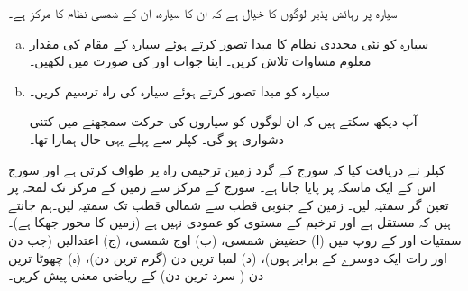 سیارہ  پر رہائش پذیر  لوگوں کا خیال ہے کہ ان کا سیارہ، ان کے شمسی نظام کا مرکز ہے۔
\begin{enumerate}[a.]
\item
سیارہ  کو نئی محددی نظام کا  مبدا  تصور کرتے ہوئے سیارہ  کے مقام کی مقدار معلوم مساوات تلاش کریں۔ اپنا جواب  اور کی صورت میں لکھیں۔
\item
سیارہ  کو مبدا  تصور کرتے ہوئے  سیارہ  کی راہ ترسیم کریں۔

آپ دیکھ سکتے ہیں کہ ان لوگوں کو سیاروں کی حرکت سمجھنے میں کتنی دشواری ہو گی۔ کپلر سے پہلے یہی حال ہمارا تھا۔ 
\end{enumerate}
کپلر نے دریافت کیا  کہ سورج کے گرد زمین ترخیمی راہ  پر  طواف کرتی ہے اور سورج اس کے ایک ماسکہ پر پایا جاتا ہے۔ سورج کے مرکز سے زمین کے مرکز تک لمحہ  پر تعین گر  سمتیہ  لیں۔ زمین کے جنوبی قطب  سے شمالی قطب تک سمتیہ  لیں۔ہم جانتے ہیں کہ  مستقل ہے اور ترخیم  کے مستوی  کو عمودی نہیں ہے (زمین کا محور  جھکا  ہے)۔ سمتیات  اور  کے روپ میں (ا)  حضیض شمسی، (ب) اوج شمسی، (ج)  اعتدالین  (جب دن اور رات ایک دوسرے کے برابر ہوں)، (د) لمبا ترین دن (گرم ترین دن)، (ہ) چھوٹا ترین دن ( سرد ترین دن) کے  ریاضی  معنی  پیش کریں۔
